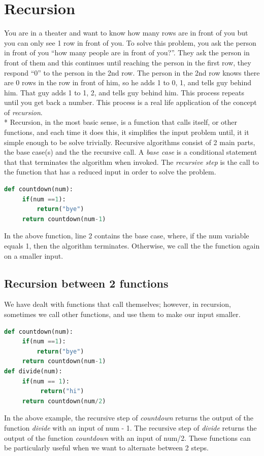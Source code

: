 \documentclass{article}
\begin{document}
\section{Recursion}
You are in a theater and want to know how many rows are in front of you but you can only see 1 row in front of you. To solve this problem, you ask the person in front of you “how many people are in front of you?”. They ask the person in front of them and this continues until reaching the person in the first row, they respond “0” to the person in the 2nd row. The person in the 2nd row knows there are 0 rows in the row in front of him, so he adds 1 to 0, 1, and tells guy behind him. That guy adds 1 to 1, 2, and tells guy behind him. This process repeats until you get back a number. This process is a real life application of the concept of \emph{recursion}. \\*
\bigskip
Recursion, in the most basic sense, is a function that calls itself, or other functions, and each time it does this, it simplifies the input problem until, it it simple enough to be solve trivially. Recursive algorithms consist of 2 main parts, the base case(s) and the the recursive call. A \emph{base case} is a conditional statement that that terminates the algorithm when invoked. The \emph{recursive step} is the call to the function that has a reduced input in order to solve the problem.
\begin{lstlisting}[language = Python]
def countdown(num):
     if(num ==1):
         return("bye")
     return countdown(num-1)
\end{lstlisting}
In the above function, line 2 contains the base case, where, if the num variable equals 1, then the algorithm terminates. Otherwise, we call the the function again on a smaller input. 

\subsection{Recursion between 2 functions}
We have dealt with functions that call themselves; however, in recursion, sometimes we call other functions, and use them to make our input smaller.
\begin{lstlisting}[language = Python]
def countdown(num):
     if(num ==1):
         return("bye")
     return countdown(num-1)
def divide(num):
     if(num == 1):
          return("hi")
     return countdown(num/2)
\end{lstlisting}
In the above example, the recursive step of \emph{countdown} returns the output of the function \emph{divide} with an input of num - 1. The recursive step of \emph{divide} returns the output of the function \emph{countdown} with an input of num/2. These functions can be particularly useful when we want to alternate between 2 steps. 
\end{document}
